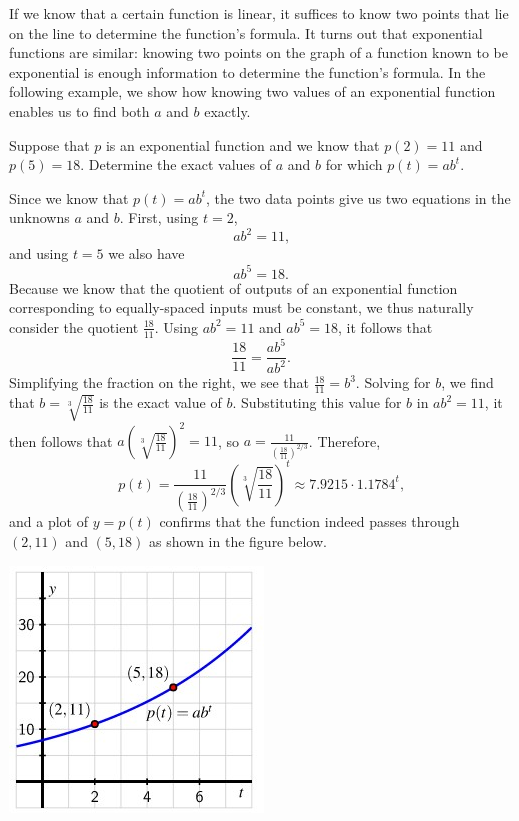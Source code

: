 \documentclass[nooutcomes]{ximera}
\begin{document}
If we know that a certain function is linear, it suffices to know two points that lie on the line to determine the function's formula.  It turns out that exponential functions are similar:  knowing two points on the graph of a function known to be exponential is enough information to determine the function's formula.  In the following example, we show how knowing two values of an exponential function enables us to find both \(a\) and \(b\) exactly.

\begin{example}
Suppose that \(p\) is an exponential function and we know that \(p(2) = 11\) and \(p(5) = 18\).  Determine the exact values of \(a\) and \(b\) for which \(p(t) = ab^t\).
\begin{explanation}
Since we know that \(p(t) = ab^t\), the two data points give us two equations in the unknowns \(a\) and \(b\).  First, using \(t = 2\),%
\begin{equation}
ab^2 = 11\text{,}
\end{equation}
and using \(t = 5\) we also have%
\begin{equation}
ab^5 = 18\text{.}
\end{equation}
Because we know that the quotient of outputs of an exponential function corresponding to equally-spaced inputs must be constant, we thus naturally consider the quotient \(\frac{18}{11}\).  Using $ab^2 = 11$ and $ab^5 = 18$, it follows that%
\begin{equation*}
\frac{18}{11} = \frac{ab^5}{ab^2}\text{.}
\end{equation*}
Simplifying the fraction on the right, we see that \(\frac{18}{11} = b^3\). Solving for \(b\), we find that \(b = \sqrt[3]{\frac{18}{11}}\) is the exact value of \(b\).  Substituting this value for \(b\) in $ab^2 = 11$, it then follows that \(a \left( \sqrt[3]{\frac{18}{11}} \right)^2 = 11\), so \(a = \frac{11}{\left( \frac{18}{11} \right)^{2/3}}\).  Therefore,%
\begin{equation*}
p(t) = \frac{11}{\left( \frac{18}{11} \right)^{2/3}} \left( \sqrt[3]{\frac{18}{11}} \right)^t \approx 7.9215 \cdot 1.1784^t\text{,}
\end{equation*}
and a plot of \(y = p(t)\) confirms that the function indeed passes through \((2,11)\) and \((5,18)\) as shown in the figure below.

\begin{image}
\includegraphics{ExpText3.jpg}
\end{image}

\end{explanation}
\end{example}
\end{document}
